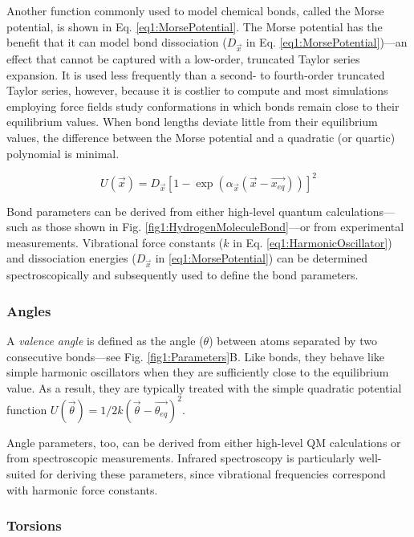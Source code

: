 Another function commonly used to model chemical bonds, called the Morse
potential, is shown in Eq. \ref{eq1:MorsePotential}. The Morse potential has the
benefit that it can model bond dissociation ($D_{\vec{x}}$ in Eq.
\ref{eq1:MorsePotential})---an effect that cannot be captured with a low-order,
truncated Taylor series expansion. It is used less frequently than a second- to
fourth-order truncated Taylor series, however, because it is costlier to compute
and most simulations employing force fields study conformations in which bonds
remain close to their equilibrium values. When bond lengths deviate little from
their equilibrium values, the difference between the Morse potential and a
quadratic (or quartic) polynomial is minimal.
\cite{Cramer_Book_EssentialsCompChem_2004}

\begin{equation}
   U(\vec{x}) = D_{\vec{x}} \left [ 1 - \exp \left ( \alpha _ {\vec{x}} (
                \vec{x} - \vec{x_{eq}} ) \right ) \right ] ^ 2
   \label{eq1:MorsePotential}
\end{equation}

Bond parameters can be derived from either high-level quantum
calculations---such as those shown in Fig. \ref{fig1:HydrogenMoleculeBond}---or
from experimental measurements. Vibrational force constants ($k$ in Eq.
\ref{eq1:HarmonicOscillator}) and dissociation energies ($D_{\vec{x}}$ in
\ref{eq1:MorsePotential}) can be determined spectroscopically and subsequently
used to define the bond parameters.

\subsubsection{Angles}

A \emph{valence angle} is defined as the angle ($\theta$) between atoms
separated by two consecutive bonds---see Fig. \ref{fig1:Parameters}B. Like
bonds, they behave like simple harmonic oscillators when they are sufficiently
close to the equilibrium value. As a result, they are typically treated with the
simple quadratic potential function $U(\vec{\theta}) = 1/2 k (\vec{\theta} -
\vec{\theta _ {eq}}) ^ 2$.

Angle parameters, too, can be derived from either high-level QM calculations or
from spectroscopic measurements. Infrared spectroscopy is particularly
well-suited for deriving these parameters, since vibrational frequencies
correspond with harmonic force constants.

\subsubsection{Torsions}

